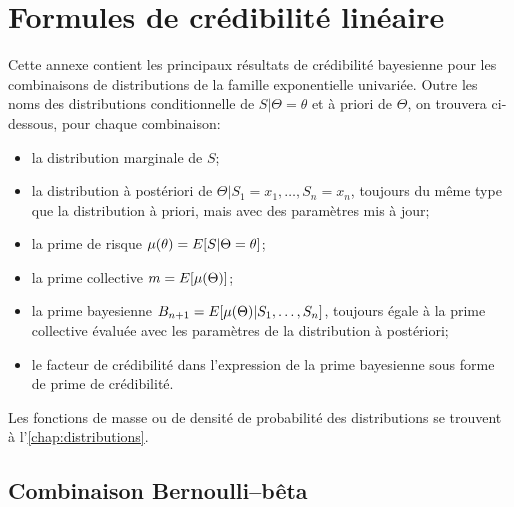 \chapter{Formules de crédibilité linéaire}
\label{chap:formules}

Cette annexe contient les principaux résultats de crédibilité
bayesienne pour les combinaisons de distributions de la famille
exponentielle univariée. Outre les noms des distributions
conditionnelle de $S|\Theta = \theta$ et à priori de $\Theta$, on
trouvera ci-dessous, pour chaque combinaison:
\begin{itemize}
\item la distribution marginale de $S$;
\item la distribution à postériori de
  $\Theta|S_1 = x_1, \dots, S_n = x_n$, toujours du même type que la
  distribution à priori, mais avec des paramètres mis à jour;
\item la prime de risque $\mu(\theta) = E [ S|\Theta = \theta ]$;
\item la prime collective $m = E [ \mu(\Theta) ]$;
\item la prime bayesienne
  $B_{n+1} = E [ \mu(\Theta)|S_1, \dots, S_n ]$, toujours égale à la
  prime collective évaluée avec les paramètres de la distribution à
  postériori;
\item le facteur de crédibilité dans l'expression de la prime
  bayesienne sous forme de prime de crédibilité.
\end{itemize}

Les fonctions de masse ou de densité de probabilité des distributions
se trouvent à l'\autoref{chap:distributions}.


\begingroup
{}

\section{Combinaison Bernoulli--bêta}

